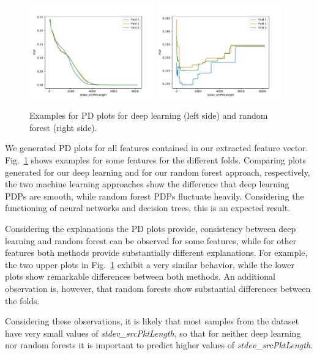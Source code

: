 \documentclass[10pt,sigconf,letterpaper,dvipsnames]{acmart}
\begin{document}
\begin{figure}[p]
\includegraphics[width=0.48\textwidth]{../pdp_CAIA_backdoor_17/apply(stdev(ipTotalLength),forward)_nn.pdf}
\includegraphics[width=0.48\textwidth]{../pdp_CAIA_backdoor_17/apply(stdev(ipTotalLength),forward)_rf.pdf}

\caption{Examples for PD plots for deep learning (left side) and random forest (right side).}
\label{fig:pdp}
\end{figure}

We generated PD plots for all features contained in our extracted feature vector. Fig.~\ref{fig:pdp} shows examples for some features for the different folds. Comparing plots generated for our deep learning and for our random forest approach, respectively, the two machine learning approaches show the difference that deep learning PDPs are smooth, while random forest PDPs fluctuate heavily. Considering the functioning of neural networks and decision trees, this is an expected result.

Considering the explanations the PD plots provide, consistency between deep learning and random forest can be observed for some features, while for other features both methods provide substantially different explanations. For example, the two upper plots in Fig.~\ref{fig:pdp} exhibit a very similar behavior, while the lower plots show remarkable differences between both methods. An additional observation is, however, that random forests show substantial differences between the folds.

Considering these observations, it is likely that most samples from the dataset have very small values of \textit{stdev\_srcPktLength}, so that for neither deep learning nor random forests it is important to predict higher values of \textit{stdev\_srcPktLength}.
\end{document}
